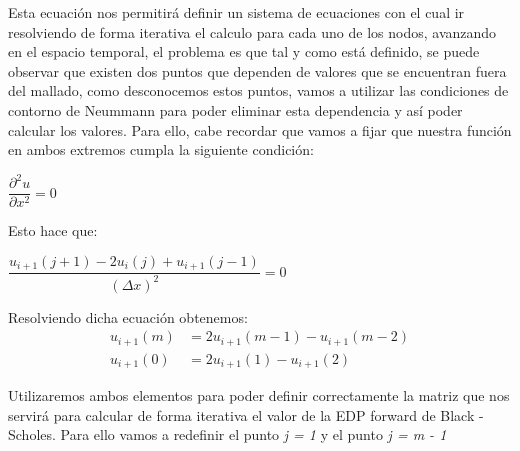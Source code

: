 \documentclass[titlepage]{article}
\begin{document}
Esta ecuación nos permitirá definir un sistema de ecuaciones con el cual ir resolviendo de forma iterativa el calculo para cada uno de los nodos, avanzando en el espacio temporal, el problema es que tal y como está definido, se puede observar que existen dos puntos que dependen de valores que se encuentran fuera del mallado, como desconocemos estos puntos, vamos a utilizar las condiciones de contorno de Neummann para poder eliminar esta dependencia y así poder calcular los valores. Para ello, cabe recordar que vamos a fijar que nuestra función en ambos extremos cumpla la siguiente condición:

\begin{center}
	$\dfrac{\partial^{2}u}{\partial{x}^{2}} = 0$
\end{center}

Esto hace que:

\begin{center}
	$\dfrac{u_{i+1}(j+1) - 2u_{i}(j) + u_{i+1}(j-1)}{(\Delta x)^2} = 0$
\end{center}

Resolviendo dicha ecuación obtenemos:
\begin{align*}
	u_{i+1}(m) &= 2u_{i+1}(m-1) - u_{i+1}(m-2)\\
	u_{i+1}(0) &= 2u_{i+1}(1) - u_{i+1}(2)
\end{align*}
	
Utilizaremos ambos elementos para poder definir correctamente la matriz que nos servirá para calcular de forma iterativa el valor de la EDP forward de Black - Scholes. Para ello vamos a redefinir el punto \textit{j = 1} y el punto \textit{j = m - 1}
\end{document}
